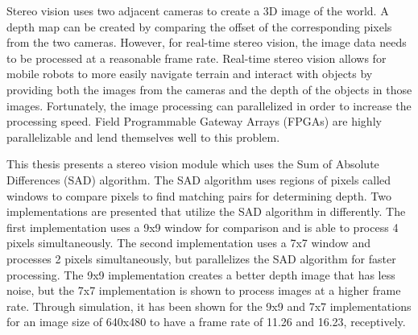 Stereo vision uses two adjacent cameras to create a 3D image of the world. A depth map can be created by comparing the offset of the corresponding pixels from the two cameras. However, for real-time stereo vision, the image data needs to be processed at a reasonable frame rate. Real-time stereo vision allows for mobile robots to more easily navigate terrain and interact with objects by providing both the images from the cameras and the depth of the objects in those images. Fortunately, the image processing can parallelized in order to increase the processing speed. Field Programmable Gateway Arrays (FPGAs) are highly parallelizable and lend themselves well to this problem.

This thesis presents a stereo vision module which uses the Sum of Absolute Differences (SAD) algorithm. The SAD algorithm uses regions of pixels called windows to compare pixels to find matching pairs for determining depth. Two  implementations are presented that utilize the SAD algorithm in differently. The first implementation uses a 9x9 window for comparison and is able to process 4 pixels simultaneously. The second implementation uses a 7x7 window and processes 2 pixels simultaneously, but parallelizes the SAD algorithm for faster processing. The 9x9 implementation creates a better depth image that has less noise, but the 7x7 implementation is shown to process images at a higher frame rate. Through simulation, it has been shown for the 9x9 and 7x7 implementations for an image size of 640x480 to have a frame rate of 11.26 and 16.23, receptively.


